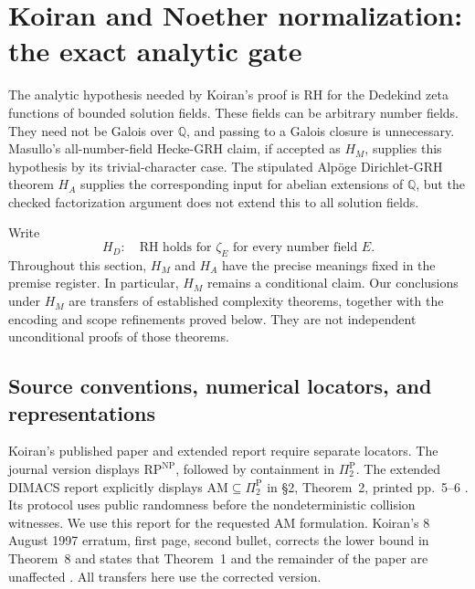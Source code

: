 
\section{Koiran and Noether normalization: the exact analytic gate}

The analytic hypothesis needed by Koiran's proof is RH for the Dedekind
zeta functions of bounded solution fields. These fields can be arbitrary
number fields. They need not be Galois over $\mathbb Q$, and passing to a
Galois closure is unnecessary. Masullo's all-number-field Hecke-GRH claim,
if accepted as $H_M$, supplies this hypothesis by its trivial-character
case. The stipulated Alp\"oge Dirichlet-GRH theorem $H_A$ supplies the
corresponding input for abelian extensions of $\mathbb Q$, but the checked
factorization argument does not extend this to all solution fields.

Write
\[
 H_D:\quad \text{RH holds for $\zeta_E$ for every number field $E$.}
\]
Throughout this section, $H_M$ and $H_A$ have the precise meanings fixed
in the premise register. In particular, $H_M$ remains a conditional
claim. Our conclusions under $H_M$ are transfers of established
complexity theorems, together with the encoding and scope refinements
proved below. They are not independent unconditional proofs of those
theorems.

\subsection{Source conventions, numerical locators, and representations}

Koiran's published paper and extended report require separate locators.
The journal version \cite[\S2, Theorem~2, pp.~276--277]{K96} displays
$\mathrm{RP}^{\mathrm{NP}}$, followed by containment in
$\Pi_2^{\mathrm P}$. The extended DIMACS report explicitly displays
$\mathrm{AM}\subseteq\Pi_2^{\mathrm P}$ in \S2, Theorem~2,
printed pp.~5--6 \cite{K96TR}. Its protocol uses public randomness before
the nondeterministic collision witnesses. We use this report for the
requested AM formulation. Koiran's 8 August 1997 erratum, first page,
second bullet, corrects the lower bound in Theorem~8 and states that
Theorem~1 and the remainder of the paper are unaffected
\cite{K97Err}. All transfers here use the corrected version.

